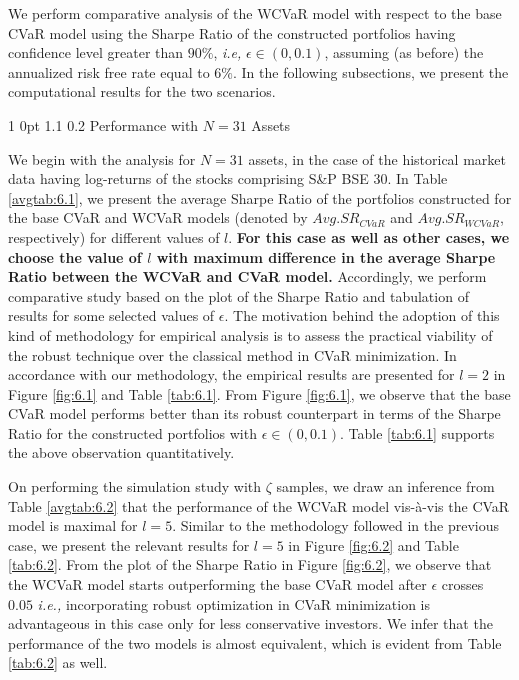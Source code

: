 \documentclass[12pt]{article}
\makeatletter
\numberwithin{equation}{section}
\renewcommand{\subsubsection}{
  \@startsection
  {subsubsection}%
  {1}%
  {0pt}%
  {1.1\baselineskip}%
  {0.2\baselineskip}%
  {\sc \centering}%
}
\makeatother
\begin{document}
We perform comparative analysis of the WCVaR model with respect to the base CVaR model using the Sharpe Ratio of the constructed portfolios having confidence level greater than $90\%$, \textit{i.e,} $\epsilon \in (0,0.1)$, assuming (as before) the annualized risk free rate equal to $6\%$. In the following subsections, we present the computational results for the two scenarios.

\subsubsection{Performance with $N=31$ Assets}

We begin with the analysis for $N=31$ assets, in the case of the historical market data having log-returns of the stocks comprising S\&P BSE 30. In Table \ref{avgtab:6.1}, we present the average Sharpe Ratio of the portfolios constructed for the base CVaR and WCVaR models (denoted by $Avg. SR_{CVaR}$ and $Avg. SR_{WCVaR}$, respectively) for different values of $l$. \textbf{For this case as well as other cases, we choose the value of $l$ with maximum difference in the average Sharpe Ratio between the WCVaR and CVaR model.} Accordingly, we perform comparative study based on the plot of the Sharpe Ratio and tabulation of results for some selected values of $\epsilon$. The motivation behind the adoption of this kind of methodology for empirical analysis is to assess the practical viability of the robust technique over the classical method in CVaR minimization. In accordance with our methodology, the empirical results are presented for $l=2$ in Figure \ref{fig:6.1} and Table \ref{tab:6.1}. From Figure \ref{fig:6.1}, we observe that the base CVaR model performs better than its robust counterpart in terms of the Sharpe Ratio for the constructed portfolios with $\epsilon \in (0,0.1)$. Table \ref{tab:6.1} supports the above observation quantitatively.

On performing the simulation study with $\zeta$ samples, we draw an inference from Table \ref{avgtab:6.2} that the performance of the WCVaR model vis-\`a-vis the CVaR model is maximal for $l=5$. Similar to the methodology followed in the previous case, we present the relevant results for $l=5$ in Figure \ref{fig:6.2} and Table \ref{tab:6.2}. From the plot of the Sharpe Ratio in Figure \ref{fig:6.2}, we observe that the WCVaR model starts outperforming the base CVaR model after $\epsilon$ crosses $0.05$ \textit{i.e.,} incorporating robust optimization in CVaR minimization is advantageous in this case only for less conservative investors. We infer that the performance of the two models is almost equivalent, which is evident from Table \ref{tab:6.2} as well.
\end{document}
